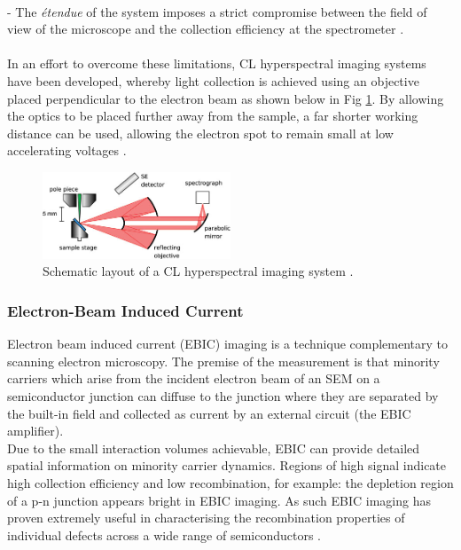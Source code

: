 \\\indent - The {\it\'{e}tendue} of the system imposes a strict compromise between the field of view of the microscope and the collection efficiency at the spectrometer \cite{Edwards2011}.\\
\\\indent In an effort to overcome these limitations, CL hyperspectral imaging systems have been developed, whereby light collection is achieved using an objective placed perpendicular to the electron beam as shown below in Fig \ref{2.7}. By allowing the optics to be placed further away from the sample, a far shorter working distance can be used, allowing the electron spot to remain small at low accelerating voltages \cite{Edwards2011}. 

\begin{figure}[!ht]
	\centering
	\includegraphics[width=0.5\textwidth]{Figs/Ch2/hyper.png}
	\caption[h] {Schematic layout of a CL hyperspectral imaging system \cite{Edwards2012}.}
	\label{2.7}
\end{figure}
\FloatBarrier

\subsubsection{Electron-Beam Induced Current}

Electron beam induced current  (EBIC) imaging is a technique complementary to scanning electron microscopy. The premise of the measurement is that minority carriers which arise from the incident electron beam of an SEM on a semiconductor junction can diffuse to the junction where they are separated by the built-in field and collected as current by an external circuit (the EBIC amplifier).\\
Due to the small interaction volumes achievable, EBIC can provide detailed spatial information on minority carrier dynamics. Regions of high signal indicate high collection efficiency and low recombination, for example: the depletion region of a p-n junction appears bright in EBIC imaging. As such EBIC imaging has proven extremely useful in characterising the recombination properties of individual defects across a wide range of semiconductors \cite{Yakimov2002}.  


